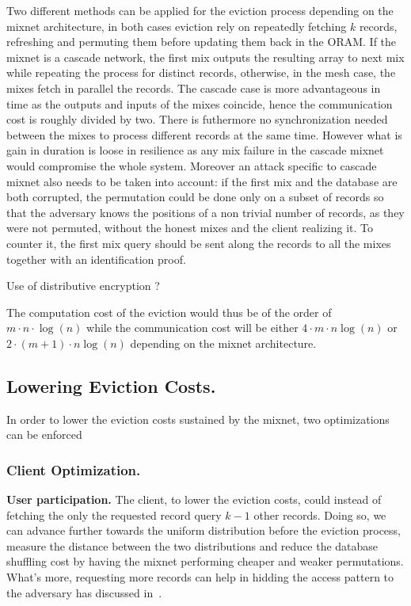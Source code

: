 \documentclass[a4paper]{article}
\begin{document}
Two different methods can be applied for the eviction process depending on the mixnet architecture, in both cases eviction rely on repeatedly fetching $k$ records, refreshing and permuting them before updating them back in the ORAM.
If the mixnet is a cascade network, the first mix outputs the resulting array to next mix while repeating the process for distinct records, otherwise, in the mesh case, the mixes fetch in parallel the records.
The cascade case is more advantageous in time as the outputs and inputs of the mixes coincide, hence the communication cost is roughly divided by two. There is futhermore no synchronization needed between the mixes to process different records at the same time.
However what is gain in duration is loose in resilience as any mix failure in the cascade mixnet would compromise the whole system. Moreover an attack specific to cascade mixnet also needs to be taken into account: if the first mix and the database are both corrupted, the permutation could be done only on a subset of records
so that the adversary knows the positions of a non trivial number of records, as they were not permuted, without the honest mixes and the client realizing it. To counter it, the first mix query should be sent along the records to all the mixes together with an identification proof.

Use of distributive encryption ?



The computation cost of the eviction would thus be of the order of $m\cdot n \cdot \log(n)$ while the communication cost will be either $4\cdot m \cdot n \log(n)$ or $2\cdot(m+1) \cdot n \log(n)$ depending on the mixnet architecture.

\subsection{Lowering Eviction Costs.}

In order to lower the eviction costs sustained by the mixnet, two optimizations can be enforced

\subsubsection{Client Optimization.}
\textbf{User participation.}
The client, to lower the eviction costs, could instead of fetching the only the requested record query $k-1$ other records. Doing so, we can advance further towards the uniform distribution before the eviction process, measure the distance between the two distributions and reduce the database shuffling cost by having the mixnet performing cheaper and weaker permutations.
What's more, requesting more records can help in hidding the access pattern to the adversary has discussed in~\cite{Lower cost PIR}.
\end{document}
